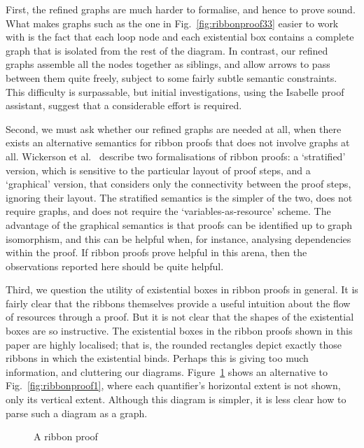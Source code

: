 \documentclass[svgnames]{llncs}
\begin{document}
First, the refined graphs are much harder to formalise, and hence to prove sound. What makes graphs such as the one in Fig.~\ref{fig:ribbonproof33} easier to work with is the fact that each loop node and each existential box contains a complete graph that is isolated from the rest of the diagram. In contrast, our refined graphs assemble all the nodes together as siblings, and allow arrows to pass between them quite freely, subject to some fairly subtle semantic constraints. This difficulty is surpassable, but initial investigations, using the Isabelle proof assistant, suggest that a considerable effort is required.

Second, we must ask whether our refined graphs are needed at all, when there exists an alternative semantics for ribbon proofs that does not involve graphs at all. Wickerson et al.~\cite{wickerson+13} describe two formalisations of ribbon proofs: a `stratified' version, which is sensitive to the particular layout of proof steps, and a `graphical' version, that considers only the connectivity between the proof steps, ignoring their layout. The stratified semantics is the simpler of the two, does not require graphs, and does not require the `variables-as-resource' scheme. The advantage of the graphical semantics is that proofs can be identified up to graph isomorphism, and this can be helpful when, for instance, analysing dependencies within the proof. If ribbon proofs prove helpful in this arena, then the observations reported here should be quite helpful.

Third, we question the utility of existential boxes in ribbon proofs in general. It is fairly clear that the ribbons themselves provide a useful intuition about the flow of resources through a proof. But it is not clear that the shapes of the existential boxes are so instructive. The existential boxes in the ribbon proofs shown in this paper are highly localised; that is, the rounded rectangles depict exactly those ribbons in which the existential binds. Perhaps this is giving too much information, and cluttering our diagrams. Figure~\ref{fig:ribbonproof6} shows an alternative to Fig.~\ref{fig:ribbonproof1}, where each quantifier's horizontal extent is not shown, only its vertical extent. Although this diagram is simpler, it is less clear how to parse such a diagram as a graph.

\begin{figure}
\begin{center}

\end{center}
\caption{A ribbon proof}
\label{fig:ribbonproof6}
\end{figure}
\end{document}
